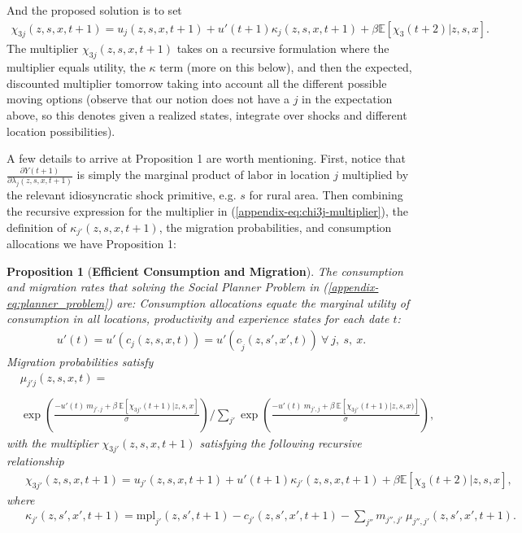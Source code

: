 \documentclass[12pt,pdftex]{article}
\newtheorem{proposition}{Proposition}
\begin{document}
And the proposed solution is to set
\begin{align}
\chi_{3j}(z, s, x, t+1) =  u_{j}(z,s,x,t+1) +  u'(t+1) \kappa_j(z,s,x,t+1) + \beta \mathbb{E}\left[\chi_{3}(t+2) |z, s, x \right].
\label{appendix-eq:chi3j-multiplier}
\end{align}
The multiplier $\chi_{3j}(z, s, x, t+1)$ takes on a recursive formulation where the multiplier equals utility, the $\kappa$ term (more on this below), and then the expected, discounted multiplier tomorrow taking into account all the different possible moving options (observe that our notion does not have a $j$ in the expectation above, so this denotes given a realized states, integrate over shocks and different location possibilities).


A few details to arrive at Proposition 1 are worth mentioning.  First, notice that $\frac{\partial Y(t+1)}{\partial \lambda_{j}(z, s, x, t+1)} $ is simply the marginal product of labor in location $j$ multiplied by the relevant idiosyncratic shock primitive, e.g. $s$ for rural area. Then combining the recursive expression for the multiplier in (\ref{appendix-eq:chi3j-multiplier}), the definition of $\kappa_{j'}(z, s,x,t+1)$,  the migration probabilities, and consumption allocations we have Proposition 1:

\begin{proposition}[\textbf{Efficient Consumption and Migration}] \label{apx-prp:efficient} The consumption and migration rates that solving the Social Planner Problem in (\ref{appendix-eq:planner_problem}) are: Consumption allocations equate the marginal utility of consumption in all locations, productivity and experience states for each date $t$:
{\small
\begin{align}
u'(t) = u'(c_{j}(z, s, x, t)) = u'(c_{\tilde{j}}(z, s', x', t)) \ \forall \ j, \ s, \ x.
\label{appendix-eq:foc_planner2}
\end{align}
}
Migration probabilities satisfy
{\footnotesize
\begin{align}
& \mu_{j'j}(z,s,x,t)  = \nonumber \\
\nonumber \\
& \exp \left(\frac{- u'(t) \ m_{j',j} + \beta \ \mathbb{E}\left[\chi_{3j'}(t+1)| z,s,x\right]}{\sigma} \right)  \Bigg / \sum_{j'} \exp \left( \frac{- u'(t)\ m_{j',j} + \beta \  \mathbb{E}\left[\chi_{3j'}(t+1)|z,s,x ) \right]}{\sigma} \right), \label{appendix-eq:migration_prob}
\end{align}
}
with the multiplier $\chi_{3j'}(z, s, x, t+1)$ satisfying the following recursive relationship
{\small
\begin{align}
& \ \ \chi_{3j'}(z, s, x, t+1) =  u_{j'}(z, s, x, t+1) +  u'(t+1) \kappa_{j'}(z, s,x,t+1) + \beta \mathbb{E}\left[\chi_{3}(t+2)|z, s, x  \right], \label{appendix-eq:dynamic_multiplier}
\end{align}}
where
{\small
\begin{align}
& \ \ \kappa_{j'}(z, s',x',t+1) = \mbox{mpl}_{j'}(z,s',t+1) - c_{j'}(z, s',x',t+1) - \sum_{j''}  m_{j'',j'} \ \mu_{j'',j'}(z, s', x', t+1). \label{appendix-eq:kappa}
\end{align}}
\end{proposition}
\end{document}
